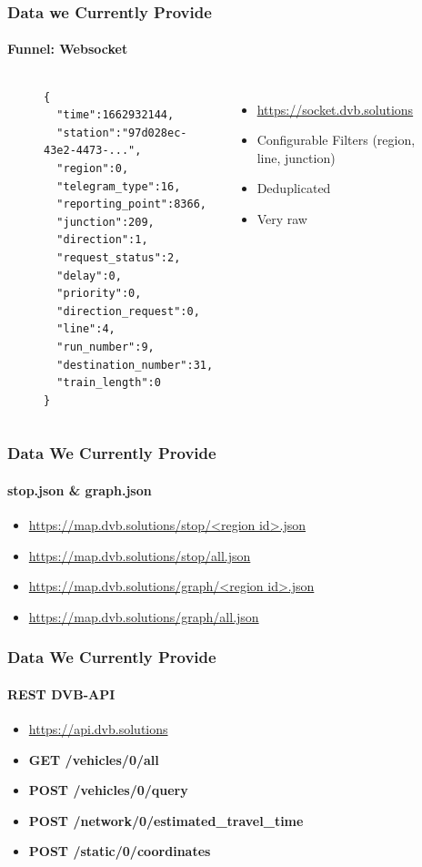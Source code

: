 \begin{frame}[fragile]
\frametitle{Data we Currently Provide}
\framesubtitle{Funnel: Websocket}
\begin{figure}
\begin{columns}
\begin{lstlisting}[basicstyle=\scriptsize]
{
  "time":1662932144,
  "station":"97d028ec-43e2-4473-...",
  "region":0,
  "telegram_type":16,
  "reporting_point":8366,
  "junction":209,
  "direction":1,
  "request_status":2,
  "delay":0,
  "priority":0,
  "direction_request":0,
  "line":4,
  "run_number":9,
  "destination_number":31,
  "train_length":0
}
\end{lstlisting}
\raggedright
\vspace{0.5cm}

\begin{itemize}
  \item \url{https://socket.dvb.solutions}
  \item Configurable Filters (region, line, junction)
  \item Deduplicated
  \item Very raw
\end{itemize}
\end{columns}
\end{figure}
\end{frame}


\begin{frame}[fragile]
\frametitle{Data We Currently Provide}
\framesubtitle{stop.json \& graph.json}

  \begin{itemize}
    \item \url{https://map.dvb.solutions/stop/<region id>.json}
    \item \url{https://map.dvb.solutions/stop/all.json}
    \item \url{https://map.dvb.solutions/graph/<region id>.json}
    \item \url{https://map.dvb.solutions/graph/all.json}
  \end{itemize}
\end{frame}

\begin{frame}[fragile]
\frametitle{Data We Currently Provide}
\framesubtitle{REST DVB-API}

\begin{itemize}
     \item \url{https://api.dvb.solutions}
     \item \textbf{GET  /vehicles/0/all}
     \item \textbf{POST /vehicles/0/query}
     \item \textbf{POST /network/0/estimated\_travel\_time}
     \item \textbf{POST /static/0/coordinates}
  \end{itemize}
\end{frame}

